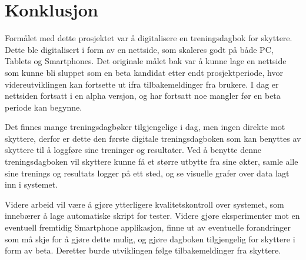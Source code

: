 \chapter{Konklusjon}

Formålet med dette prosjektet var å digitalisere en treningsdagbok for skyttere. Dette ble digitalisert i form av en nettside, som skaleres godt på både PC, Tablets og Smartphones. Det originale målet bak var å kunne lage en nettside som kunne bli sluppet som en beta kandidat etter endt prosjektperiode, hvor videreutviklingen kan fortsette ut ifra tilbakemeldinger fra brukere. I dag er nettsiden fortsatt i en alpha versjon, og har fortsatt noe mangler før en beta periode kan begynne. 


Det finnes mange treningsdagbøker tilgjengelige i dag, men ingen direkte mot skyttere, derfor er dette den første digitale treningsdagboken som kan benyttes av skyttere til å loggføre sine treninger og resultater. Ved å benytte denne treningsdagboken vil skyttere kunne få et større utbytte fra sine økter, samle alle sine trenings og resultats logger på ett sted, og se visuelle grafer over data lagt inn i systemet.


Videre arbeid vil være å gjøre ytterligere kvalitetskontroll over systemet, som innebærer å lage automatiske skript for tester. Videre gjøre eksperimenter mot en eventuell fremtidig Smartphone applikasjon, finne ut av eventuelle forandringer som må skje for å gjøre dette mulig, og gjøre dagboken tilgjengelig for skyttere i form av beta. Deretter burde utviklingen følge tilbakemeldinger fra skyttere.



